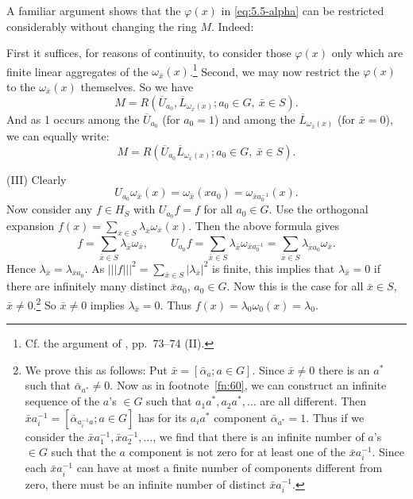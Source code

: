 \documentclass[b5paper,twoside]{article}
\theoremstyle{mvnplain}
\newcommand{\M}{\mathbf M}
\newcommand{\R}{\mathbf R}
\newcommand{\Hilbert}{\mathfrak H}
\newcommand{\OpNorm}[1]{\left\lvert\left\lvert\left\lvert#1\right\rvert\right\rvert\right\rvert}
\def\M{M}%
\def\R{R}%
\def\Hilbert{H}%
\def\mathfrak#1{#1}%
\begin{document}
A familiar argument shows that the \(\varphi(x)\) in \eqref{eq:5.5-alpha}
can be restricted considerably without changing the ring \(\M\). Indeed:

First it suffices, for reasons of continuity, to consider those \(\varphi(x)\)
only which are finite linear aggregates of the
\(\omega_{\bar x}(x)\).\footnote{Cf. the argument of
\cite{ref7}, pp.~73--74 (II).} Second, we may now restrict the
\(\varphi(x)\) to the \(\omega_{\bar x}(x)\) themselves. So we have
\begin{equation}\tag{5.5.\(\beta\)}\label{eq:5.5-beta}
 \M=\R(\overline U_{a_0},\overline L_{\omega_{\bar x}(x)};
 a_0\in\mathfrak G,\ \bar x\in\mathfrak S).
\end{equation}
And as 1 occurs among the \(\overline U_{a_0}\) (for \(a_0=1\)) and among
the \(\overline L_{\omega_{\bar x}(x)}\) (for \(\bar x=0\)), we can equally
write:
\begin{equation}\tag{5.5.\(\gamma\)}\label{eq:5.5-gamma}
 \M=\R(\overline U_{a_0}\overline L_{\omega_{\bar x}(x)};
 a_0\in\mathfrak G,\ \bar x\in\mathfrak S).
\end{equation}

(III) Clearly
\[
 U_{a_0}\omega_{\bar x}(x)=\omega_{\bar x}(xa_0)
 =\omega_{\bar x a_0^{-1}}(x).
\]
Now consider any \(f\in\Hilbert_S\) with \(U_{a_0}f=f\) for all
\(a_0\in\mathfrak G\). Use the orthogonal expansion
\(f(x)=\sum_{\bar x\in\mathfrak S}\lambda_{\bar x}\omega_{\bar x}(x)\).
Then the above formula gives
\[
 f=\sum_{\bar x\in\mathfrak S}\lambda_{\bar x}\omega_{\bar x},
 \qquad
 U_{a_0}f
 =\sum_{\bar x\in\mathfrak S}\lambda_{\bar x}
     \omega_{\bar x a_0^{-1}}
 =\sum_{\bar x\in\mathfrak S}\lambda_{\bar x a_0}\omega_{\bar x}.
\]
Hence \(\lambda_{\bar x}=\lambda_{\bar x a_0}\). As
\(\OpNorm{f}^2=\sum_{\bar x\in\mathfrak S}|\lambda_{\bar x}|^2\) is finite,
this implies that \(\lambda_{\bar x}=0\) if there are infinitely many distinct
\(\bar x a_0\), \(a_0\in\mathfrak G\). Now this is the case for all
\(\bar x\in\mathfrak S\), \(\bar x\ne0\).\footnote{\label{fn:65}We prove this as follows:
Put \(\bar x=[\bar\alpha_a;a\in\mathfrak G]\). Since \(\bar x\ne0\) there
is an \(a^*\) such that \(\bar\alpha_{a^*}\ne0\). Now as in
footnote~\ref{fn:60}, we
can construct an infinite sequence of the \(a\)'s \(\in\mathfrak G\) such
that \(a_1a^*,a_2a^*,\ldots\) are all different. Then
\(\bar x a_i^{-1}=[\bar\alpha_{a_i^{-1}a};a\in\mathfrak G]\) has for its
\(a_ia^*\) component \(\bar\alpha_{a^*}=1\). Thus if we consider the
\(\bar x a_1^{-1},\bar x a_2^{-1},\ldots\), we find that there is an infinite
number of \(a\)'s \(\in\mathfrak G\) such that the \(a\) component is not
zero for at least one of the \(\bar x a_i^{-1}\). Since each
\(\bar x a_i^{-1}\) can have at most a finite number of components different
from zero, there must be an infinite number of distinct \(\bar x a_i^{-1}\).}
So \(\bar x\ne0\) implies \(\lambda_{\bar x}=0\). Thus
\(f(x)=\lambda_0\omega_0(x)=\lambda_0\).
\end{document}
